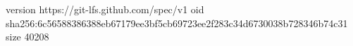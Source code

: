 version https://git-lfs.github.com/spec/v1
oid sha256:6c56588386388eb67179ee3bf5cb69723ee2f283c34d6730038b728346b74c31
size 40208
